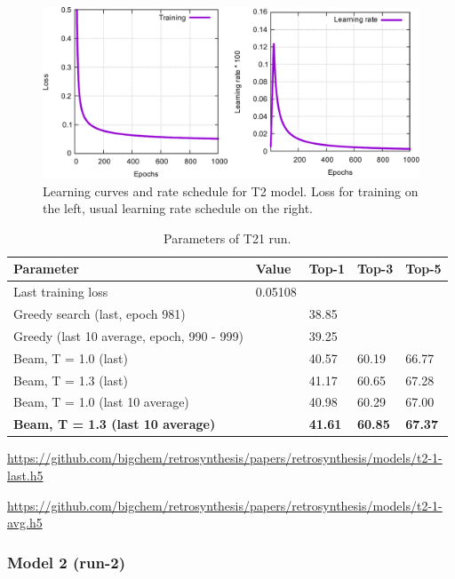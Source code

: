 \documentclass{article}
\begin{document}
\begin{figure}[h!]
  \centering
  \includegraphics[width = 16.5cm]{images/t2-1.pdf}
  \caption{Learning curves and rate schedule for T2 model. Loss for training on the left, usual learning rate schedule on the right.}
  \label{fig:t21}
\end{figure}

\begin{table}[h!]
\caption{Parameters of T21 run.}
  \centering
  \begin{tabular}{p{8.2cm}p{1.5cm}p{1.5cm}p{1.5cm}p{1.5cm}}
    \toprule
    Parameter & Value & Top-1 & Top-3 & Top-5 \\
    \midrule
    Last training loss & 0.05108 & & & \\
    \midrule
    Greedy search (last, epoch 981) & & 38.85 & & \\
    Greedy (last 10 average, epoch, 990 - 999) & & 39.25 & & \\
    \midrule
    Beam, T = 1.0 (last) & & 40.57 &60.19  & 66.77 \\
    Beam, T = 1.3 (last) & & 41.17 & 60.65 &  67.28 \\ 
    \midrule
    Beam, T = 1.0 (last 10 average) & & 40.98 & 60.29 & 67.00 \\
    \textbf{Beam, T = 1.3 (last 10 average)} & &  \textbf{41.61} & \textbf{60.85} & \textbf{67.37} \\ 
    \bottomrule
  \end{tabular}
  \label{tbl:t21}

\end{table} 

\url{https://github.com/bigchem/retrosynthesis/papers/retrosynthesis/models/t2-1-last.h5}

\url{https://github.com/bigchem/retrosynthesis/papers/retrosynthesis/models/t2-1-avg.h5}

\newpage
 \subsubsection{Model 2 (run-2)}
 
\end{document}
